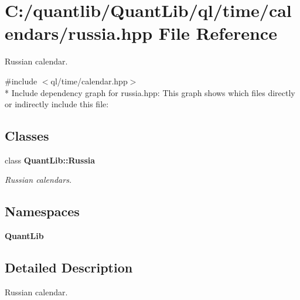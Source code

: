 \section{C\+:/quantlib/\+Quant\+Lib/ql/time/calendars/russia.hpp File Reference}
\label{russia_8hpp}


Russian calendar.  


{\ttfamily \#include $<$ql/time/calendar.\+hpp$>$}\\*
Include dependency graph for russia.\+hpp\+:
This graph shows which files directly or indirectly include this file\+:
\subsection*{Classes}
\begin{DoxyCompactItemize}
\item 
class {\bf Quant\+Lib\+::\+Russia}
\begin{DoxyCompactList}\small\item\em Russian calendars. \end{DoxyCompactList}\end{DoxyCompactItemize}
\subsection*{Namespaces}
\begin{DoxyCompactItemize}
\item 
 {\bf Quant\+Lib}
\end{DoxyCompactItemize}


\subsection{Detailed Description}
Russian calendar. 

